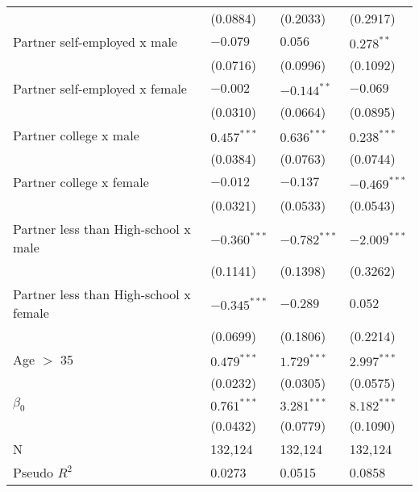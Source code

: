 \begin{tabular}{llll}
                                       &           (0.0884) &           (0.2033) &           (0.2917) \\
Partner self-employed x male           &           $-0.079$ &            $0.056$ &       $0.278^{**}$ \\
                                       &           (0.0716) &           (0.0996) &           (0.1092) \\
Partner self-employed x female         &           $-0.002$ &      $-0.144^{**}$ &           $-0.069$ \\
                                       &           (0.0310) &           (0.0664) &           (0.0895) \\
Partner college x male                 &      $0.457^{***}$ &      $0.636^{***}$ &      $0.238^{***}$ \\
                                       &           (0.0384) &           (0.0763) &           (0.0744) \\
Partner college x female               &           $-0.012$ &           $-0.137$ &     $-0.469^{***}$ \\
                                       &           (0.0321) &           (0.0533) &           (0.0543) \\
Partner less than High-school x male   &     $-0.360^{***}$ &     $-0.782^{***}$ &     $-2.009^{***}$ \\
                                       &           (0.1141) &           (0.1398) &           (0.3262) \\
Partner less than High-school x female &     $-0.345^{***}$ &           $-0.289$ &            $0.052$ \\
                                       &           (0.0699) &           (0.1806) &           (0.2214) \\
Age $>$ 35                             &      $0.479^{***}$ &      $1.729^{***}$ &      $2.997^{***}$ \\
                                       &           (0.0232) &           (0.0305) &           (0.0575) \\
$\beta_0$                              &      $0.761^{***}$ &      $3.281^{***}$ &      $8.182^{***}$ \\
                                       &           (0.0432) &           (0.0779) &           (0.1090) \\
N                                      &            132,124 &            132,124 &            132,124 \\
Pseudo $R^2$                           &             0.0273 &             0.0515 &             0.0858 \\
\bottomrule
\end{tabular}
